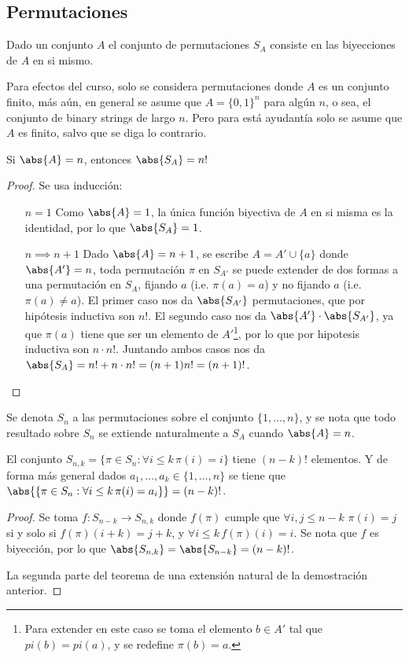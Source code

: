\documentclass{ayudantia}
\begin{document}
\subsection{Permutaciones}
\begin{defn}[Permutación]
    Dado un conjunto \(A\) el conjunto de permutaciones \(S_A\) consiste en las biyecciones de \(A\) en si mismo.
\end{defn}
\begin{remark}
    Para efectos del curso, solo se considera permutaciones donde \(A\) es un conjunto finito, más aún, en general se asume que \(A=\{0,1\}^n\) para algún \(n\), o sea, el conjunto de binary strings de largo \(n\). Pero para está ayudantía solo se asume que \(A\) es finito, salvo que se diga lo contrario.
\end{remark}
\begin{thm}
    Si \(\abs{A}=n\), entonces \(\abs{S_A}=n!\)
\end{thm}
\begin{proof}
    Se usa inducción:
    \begin{itemize}
        \item[\(n=1\)] Como \(\abs{A}=1\), la única función biyectiva de \(A\) en si misma es la identidad, por lo que \(\abs{S_A}=1\).
        \item[\(n\implies n+1\)] Dado \(\abs{A}=n+1\), se escribe \(A=A'\cup\{a\}\) donde \(\abs{A'}=n\), toda permutación \(\pi\) en \(S_{A'}\) se puede extender de dos formas a una permutación en \(S_A\), fijando \(a\) (i.e. \(\pi(a)=a\)) y no fijando \(a\) (i.e. \(\pi(a)\neq a\)). El primer caso nos da \(\abs{S_{A'}}\) permutaciones, que por hipótesis inductiva son \(n!\). El segundo caso nos da \(\abs{A'}\cdot\abs{S_{A'}}\), ya que \(\pi(a)\) tiene que ser un elemento de \(A'\)\footnote{Para extender en este caso se toma el elemento \(b\in A'\) tal que \(pi(b)=pi(a)\), y se redefine \(\pi(b)=a\).}, por lo que por hipotesis inductiva son \(n\cdot n!\). Juntando ambos casos nos da \(\abs{S_A}=n!+n\cdot n! =(n+1)n! =(n+1)!\).
    \end{itemize}
\end{proof}
\begin{remark}
    Se denota \(S_n\) a las permutaciones sobre el conjunto \(\{1,\dots, n\}\), y se nota que todo resultado sobre \(S_n\) se extiende naturalmente a \(S_A\) cuando \(\abs{A}=n\).
\end{remark}

\begin{thm}
    El conjunto \(S_{n,k}=\{\pi\in S_n:\forall i\leq k\, \pi(i)=i\}\) tiene \((n-k)!\) elementos. Y de forma más general dados \(a_1,\dots, a_k\in\{1,\dots, n\}\) se tiene que \(\abs{\{\pi\in S_n:\forall i\leq k\, \pi(i)=a_i\}}=(n-k)!\).
\end{thm}
\begin{proof}
    Se toma \(f:S_{n-k}\rightarrow S_{n,k}\) donde \(f(\pi)\) cumple que \(\forall i,j\leq n-k\) \(\pi(i)=j\) si y solo si \(f(\pi)(i+k)=j+k\), y \(\forall i\leq k\, f(\pi)(i)=i\). Se nota que \(f\) es biyección, por lo que \(\abs{S_{n,k}}=\abs{S_{n-k}}=(n-k)!\).

    La segunda parte del teorema de una extensión natural de la demostración anterior.
\end{proof}
\end{document}
